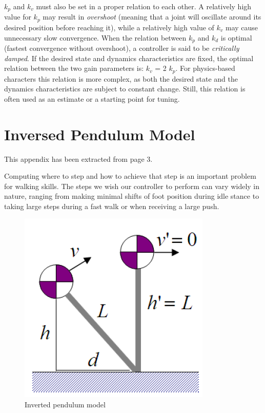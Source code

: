 \documentclass[runningheads,a4paper,10pt]{llncs}
\begin{document}
$k_p$ and $k_v$ must also be set in a proper relation to each other. A relatively high value for $k_p$ may result in \textit{overshoot} (meaning that a joint will oscillate around its desired position before reaching it), while a relatively high value of $k_v$ may cause unnecessary slow convergence. When the relation between $k_p$ and $k_d$ is optimal (fastest convergence without overshoot), a controller is said to be \textit{critically damped}. If the desired state and dynamics characteristics are fixed, the optimal relation between the two gain parameters is: $k_v$ = 2 $k_p$. For physics-based characters this relation is more complex, as both the desired state and the dynamics characteristics are subject to constant change. Still, this relation is often used as an estimate or a starting point for tuning.


\section{Inversed Pendulum Model}

This appendix has been extracted from \cite{coros2010generalized} page 3.
\vspace{5mm} %

Computing where to step and how to achieve that step is an important problem for walking skills. The steps we wish our controller to perform can vary widely in nature, ranging from making minimal shifts of foot position during idle stance to taking large steps during a fast walk or when receiving a large push. 
\vspace{-5mm} %

\begin{figure}[h]
\centering
\includegraphics[width=0.3\columnwidth]{images/ipm2010.png}
\caption{Inverted pendulum model}
\label{fig:ipm2010}
\end{figure}
\end{document}
